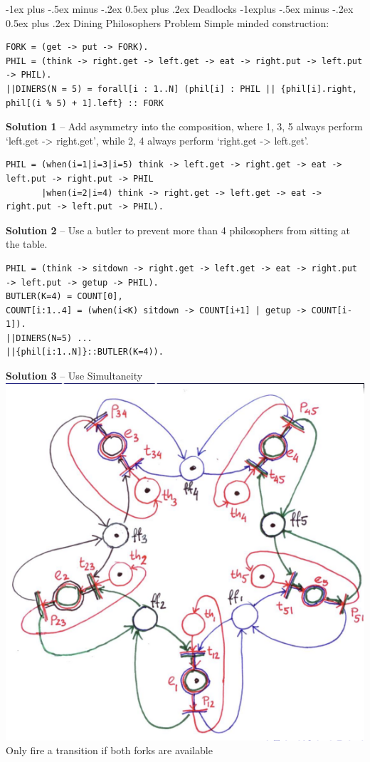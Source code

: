 \documentclass[letterpaper, 8pt]{extarticle}
\makeatletter
\renewcommand{\section}{\@startsection{section}{1}{0mm}%
                                {-1ex plus -.5ex minus -.2ex}%
                                {0.5ex plus .2ex}%
                                {\normalfont\normalsize\bfseries}}
\renewcommand{\subsection}{\@startsection{subsection}{2}{0mm}%
                                {-1explus -.5ex minus -.2ex}%
                                {0.5ex plus .2ex}%
                                {\normalfont\small\bfseries}}
\makeatother
\begin{document}
\begin{multicols*}{5}
\section{Deadlocks}
\subsection{Dining Philosophers Problem}
Simple minded construction:
\begin{lstlisting}
FORK = (get -> put -> FORK).
PHIL = (think -> right.get -> left.get -> eat -> right.put -> left.put -> PHIL).
||DINERS(N = 5) = forall[i : 1..N] (phil[i] : PHIL || {phil[i].right, phil[(i % 5) + 1].left} :: FORK
\end{lstlisting}

\textbf{Solution 1} -- Add asymmetry into the composition, where 1, 3, 5 always perform `left.get -> right.get',
while 2, 4 always perform `right.get -> left.get'.
\begin{lstlisting}
PHIL = (when(i=1|i=3|i=5) think -> left.get -> right.get -> eat -> left.put -> right.put -> PHIL
       |when(i=2|i=4) think -> right.get -> left.get -> eat -> right.put -> left.put -> PHIL).
\end{lstlisting}

\textbf{Solution 2} -- Use a butler to prevent more than 4 philosophers from sitting at the table.
\begin{lstlisting}
PHIL = (think -> sitdown -> right.get -> left.get -> eat -> right.put -> left.put -> getup -> PHIL).
BUTLER(K=4) = COUNT[0],
COUNT[i:1..4] = (when(i<K) sitdown -> COUNT[i+1] | getup -> COUNT[i-1]).
||DINERS(N=5) ...
||{phil[i:1..N]}::BUTLER(K=4)).
\end{lstlisting}

\textbf{Solution 3} -- Use Simultaneity
\includegraphics[width=\linewidth]{COMPSCI-2SD3/phil-sim.png}
Only fire a transition if both forks are available


\end{multicols*}
\end{document}
